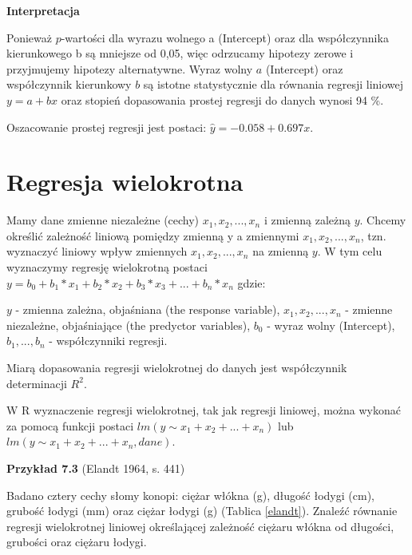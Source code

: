 \documentclass[12pt,B5paper,]{book}
\begin{document}
\vspace{0.8cm}

\textbf{Interpretacja}

Ponieważ \(p\)-wartości dla wyrazu wolnego a (Intercept) oraz dla
współczynnika kierunkowego b są mniejsze od 0,05, więc odrzucamy
hipotezy zerowe i przyjmujemy hipotezy alternatywne. Wyraz wolny \(a\)
(Intercept) oraz współczynnik kierunkowy \(b\) są istotne statystycznie
dla równania regresji liniowej \(y =a+bx\) oraz stopień dopasowania
prostej regresji do danych wynosi 94 \%.

Oszacowanie prostej regresji jest postaci: \(\hat{y}= -0.058 + 0.697x\).

\section{Regresja wielokrotna}\label{regresja-wielokrotna}

Mamy dane zmienne niezależne (cechy) \(x_1, x_2, ..., x_n\) i zmienną
zależną \(y\). Chcemy określić zależność liniową pomiędzy zmienną y a
zmiennymi \(x_1, x_2, ..., x_n\), tzn. wyznaczyć liniowy wpływ zmiennych
\(x_1, x_2, ..., x_n\) na zmienną \(y\). W tym celu wyznaczymy regresję
wielokrotną postaci
\(y = b_0 + b_1*x_1 + b_2*x_2 + b_3*x_3 + ... + b_n*x_n\) gdzie:

\(y\) - zmienna zależna, objaśniana (the response variable),
\(x_1, x_2, ..., x_n\) - zmienne niezależne, objaśniające (the predyctor
variables), \(b_0\) - wyraz wolny (Intercept), \(b_1, ..., b_n\) -
współczynniki regresji.

\vspace{0.8cm} Miarą dopasowania regresji wielokrotnej do danych jest
współczynnik determinacji \(R^2\).

W R wyznaczenie regresji wielokrotnej, tak jak regresji liniowej, można
wykonać za pomocą funkcji postaci \texttt{$lm(y \sim x_1+x_2+...+x_n)$}
lub \texttt{$lm(y \sim x_1+x_2+...+x_n, dane)$}.

\vspace{0.8cm} \textbf{Przykład 7.3} (Elandt 1964, s. 441)

Badano cztery cechy słomy konopi: ciężar włókna (g), długość łodygi
(cm), grubość łodygi (mm) oraz ciężar łodygi (g) (Tablica \ref{elandt}).
Znaleźć równanie regresji wielokrotnej liniowej określającej zależność
ciężaru włókna od długości, grubości oraz ciężaru łodygi.
\end{document}
